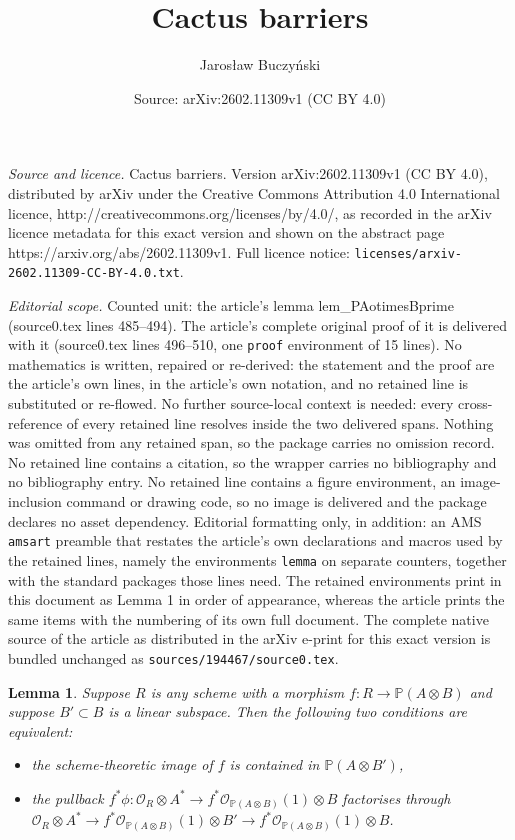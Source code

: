 \documentclass[10pt,a4paper]{amsart}
\title{Cactus barriers}
\author{Jaros{\l}aw Buczy\'nski}
\date{Source: arXiv:2602.11309v1 (CC BY 4.0)}
\newtheorem{lemma}{Lemma}
\def\PP{{\mathbb P}}
\newcommand{\ccO}{{\mathcal{O}}}
\begin{document}
\maketitle

\noindent\emph{Source and licence.} Cactus barriers. Version arXiv:2602.11309v1 (CC BY 4.0), distributed by arXiv under the Creative Commons Attribution 4.0 International licence, http://creativecommons.org/licenses/by/4.0/, as recorded in the arXiv licence metadata for this exact version and shown on the abstract page https://arxiv.org/abs/2602.11309v1. Full licence notice: \texttt{licenses/arxiv-2602.11309-CC-BY-4.0.txt}.\par\smallskip

\noindent\textit{Editorial scope.} Counted unit: the article's lemma lem\_PAotimesBprime (source0.tex lines 485--494). The article's complete original proof of it is delivered with it (source0.tex lines 496--510, one \texttt{proof} environment of 15 lines). No mathematics is written, repaired or re-derived: the statement and the proof are the article's own lines, in the article's own notation, and no retained line is substituted or re-flowed.  No further source-local context is needed: every cross-reference of every retained line resolves inside the two delivered spans.  Nothing was omitted from any retained span, so the package carries no omission record.  No retained line contains a citation, so the wrapper carries no bibliography and no bibliography entry.  No retained line contains a figure environment, an image-inclusion command or drawing code, so no image is delivered and the package declares no asset dependency.  Editorial formatting only, in addition: an AMS \texttt{amsart} preamble that restates the article's own declarations and macros used by the retained lines, namely the environments \texttt{lemma} on separate counters, together with the standard packages those lines need.  The retained environments print in this document as Lemma 1 in order of appearance, whereas the article prints the same items with the numbering of its own full document.  The complete native source of the article as distributed in the arXiv e-print for this exact version is bundled unchanged as \texttt{sources/194467/source0.tex}.
\begin{lemma}\label{lem_PAotimesBprime}
    Suppose $R$ is any scheme with a morphism  $f \colon R\to \PP(A\otimes B)$ and suppose $B' \subset B$ is a linear subspace.
    Then the following two conditions are equivalent:
    \begin{itemize}
      \item  the scheme-theoretic image of $f$ is contained in $\PP(A \otimes B')$,
      \item the pullback  $f^*\phi \colon \ccO_{R} \otimes A^* \to f^*\ccO_{\PP (A\otimes B)}(1) \otimes B$
            factorises through
            $\ccO_{R} \otimes A^* \to f^*\ccO_{\PP (A\otimes B)}(1) \otimes B'  \to   f^*\ccO_{\PP (A\otimes B)}(1) \otimes B$.
    \end{itemize}
\end{lemma}
\end{document}
